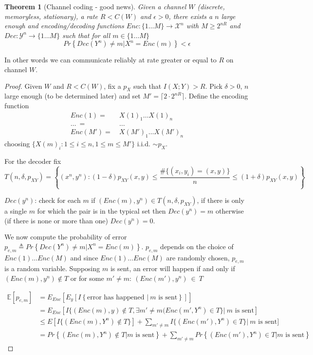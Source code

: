 \documentclass[twoside]{article}
\newtheorem{theorem}{Theorem}[section]
\theoremstyle{definition} %
\renewcommand{\Pr}[1]{Pr\left\{#1\right\}}
\newcommand{\Ex}[1]{\mathbb{E}\left[#1\right]}
\def\X{\mathcal{X}}
\def\Y{\mathcal{Y}}
\begin{document}
\begin{theorem}[Channel coding - good news]
  \label{thm:channel-coding}
  Given a channel $W$ (discrete, memoryless, stationary), a rate $R < C(W)$ and $\epsilon > 0$, there exists a $n$ large enough and encoding/decoding functions $Enc:\{1\dots M\} \to \X^n$ with $M \geq 2^{nR}$ and $Dec: \Y^n \to \{1\dots M\}$ such that for all $m\in\{1\dots M\}$
  \[
    \Pr{Dec(Y^n) \not = m | X^n = Enc(m) } < \epsilon
  \]
\end{theorem}

In other words we can communicate reliably at rate greater or equal to $R$ on channel $W$.

\begin{proof}
  Given $W$ and $R<C(W)$, fix a $p_X$ such that $I(X;Y)>R$. Pick $\delta > 0$, $n$
  large enough (to be determined later) and set $M' = \lceil 2 \cdot 2^{nR} \rceil$. Define the
  encoding function
  \begin{align*}
    Enc(1) =~&X(1)_1 \dots  X(1)_n\\
    \dots~=~&\dots\\
    Enc(M') =~&X(M')_1 \dots X(M')_n
  \end{align*}
  choosing $\{X(m)_i : 1 \leq i \leq n, 1 \leq m \leq M' \}$ i.i.d. $\sim p_X$.

  For the decoder fix
  \[
    T(n, \delta, p_{XY})= \left\{(x^n, y^n): (1-\delta)p_{XY}(x,y) \leq \frac {\# \{(x_i, y_i) = (x,y)\}} n \leq (1+\delta)p_{XY}(x,y)\right\}
  \]

  $Dec(y^n)$: check for each $m$ if $(Enc(m), y^n) \in T(n,\delta, p_{XY})$, if there is
  only a single $m$ for which the pair is in the typical set then $Dec(y^n) = m$ otherwise
  (if there is none or more than one) $Dec(y^n) = 0$.

  We now compute the probability of error $p_{e,m} \triangleq \Pr{Dec(Y^n) \not = m | X^n = Enc(m)}$. $p_{e,m}$ depends on the choice of $Enc(1) \dots Enc(M)$ and since $Enc(1) \dots Enc(M)$ are randomly chosen, $p_{e,m}$ is a random variable. Supposing $m$ is sent, an error will happen if and only if $(Enc(m), y^n) \not \in T$ or for some $m' \not = m:~(Enc(m'), y^n)~\in~T$

  \begin{align*}
    \Ex{p_{e,m}} &= E_{Enc}[ E_{y} [ I\left\{\text{error has happened $|~m$ is sent}\right\}]]\\
    &= E_{Enc}[ I\{(Enc(m),y) \not \in T, \exists m' \not=m (Enc(m', Y^n) \in T\} |~m \text{ is sent}]\\
    &\leq E[I\{(Enc(m), Y^n) \not \in T\}] + \sum_{m' \not = m} I\{(Enc(m'), Y^n) \in T\} |~m \text{ is sent}]\\
    &= \Pr{(Enc(m), Y^n) \not \in T | m \text{ is sent}} + \sum_{m'\not = m} \Pr{(Enc(m'), Y^n) \in T| m \text{ is sent}}
  \end{align*}


\end{proof}
\end{document}
